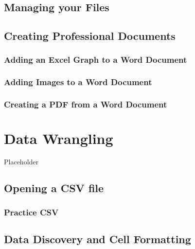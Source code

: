 \documentclass[
]{book}
\begin{document}
\hypertarget{managing-your-files}{%
\section{Managing your Files}\label{managing-your-files}}

\hypertarget{creating-professional-documents}{%
\section{Creating Professional Documents}\label{creating-professional-documents}}

\hypertarget{adding-an-excel-graph-to-a-word-document}{%
\subsection{Adding an Excel Graph to a Word Document}\label{adding-an-excel-graph-to-a-word-document}}

\hypertarget{adding-images-to-a-word-document}{%
\subsection{Adding Images to a Word Document}\label{adding-images-to-a-word-document}}

\hypertarget{creating-a-pdf-from-a-word-document}{%
\subsection{Creating a PDF from a Word Document}\label{creating-a-pdf-from-a-word-document}}

\hypertarget{data-wrangling}{%
\chapter{Data Wrangling}\label{data-wrangling}}

Placeholder

\hypertarget{opening-a-csv-file}{%
\section{Opening a CSV file}\label{opening-a-csv-file}}

\hypertarget{practice-csv}{%
\subsection{Practice CSV}\label{practice-csv}}

\hypertarget{data-discovery-and-cell-formatting}{%
\section{Data Discovery and Cell Formatting}\label{data-discovery-and-cell-formatting}}
\end{document}
